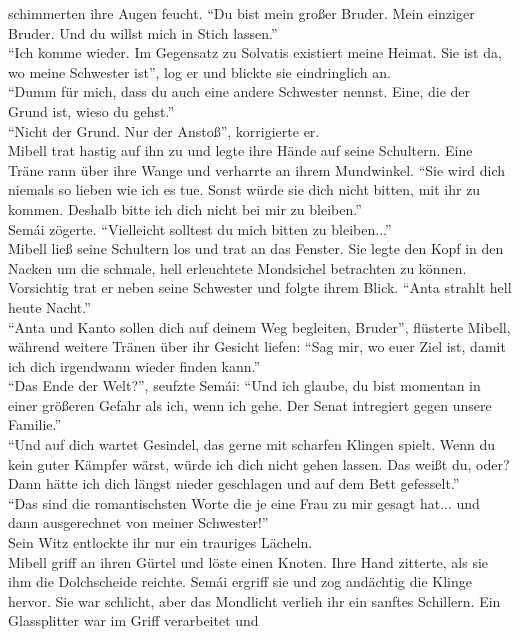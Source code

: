 schimmerten ihre Augen feucht. ``Du bist mein großer Bruder. Mein einziger Bruder. Und du willst 
mich in Stich lassen.''\\
``Ich komme wieder. Im Gegensatz zu Solvatis existiert meine Heimat. Sie ist da, wo meine Schwester 
ist'', log er und blickte sie eindringlich an.\\
``Dumm für mich, dass du auch eine andere Schwester nennst. Eine, die der Grund ist, wieso du 
gehst.''\\
``Nicht der Grund. Nur der Anstoß'', korrigierte er.\\
Mibell trat hastig auf ihn zu und legte ihre Hände auf seine Schultern. Eine Träne rann über ihre 
Wange und verharrte an ihrem Mundwinkel. ``Sie wird dich niemals so lieben wie ich es tue. Sonst 
würde sie dich nicht bitten, mit ihr zu kommen. Deshalb bitte ich dich nicht bei mir zu bleiben.''\\
Semái zögerte. ``Vielleicht solltest du mich bitten zu bleiben...''\\
Mibell ließ seine Schultern los und trat an das Fenster. Sie legte den Kopf in den Nacken um die 
schmale, hell erleuchtete Mondsichel betrachten zu können. Vorsichtig trat er neben seine Schwester 
und folgte ihrem Blick. ``Anta strahlt hell heute Nacht.''\\
``Anta und Kanto sollen dich auf deinem Weg begleiten, Bruder'', flüsterte Mibell, während weitere 
Tränen über ihr Gesicht liefen: ``Sag mir, wo euer Ziel ist, damit ich dich irgendwann wieder 
finden kann.''\\
``Das Ende der Welt?'', seufzte Semái: ``Und ich glaube, du bist momentan in einer größeren Gefahr 
als ich, wenn ich gehe. Der Senat intregiert gegen unsere Familie.''\\
``Und auf dich wartet Gesindel, das gerne mit scharfen Klingen spielt. Wenn du kein guter Kämpfer 
wärst, würde ich dich nicht gehen lassen. Das weißt du, oder? Dann hätte ich dich längst nieder 
geschlagen und auf dem Bett gefesselt.''\\
``Das sind die romantischsten Worte die je eine Frau zu mir gesagt hat... und dann ausgerechnet von 
meiner Schwester!''\\
Sein Witz entlockte ihr nur ein trauriges Lächeln. \\
Mibell griff an ihren Gürtel und löste einen Knoten. Ihre Hand zitterte, als sie ihm die 
Dolchscheide reichte. Semái ergriff sie und zog andächtig die Klinge hervor. Sie war schlicht, aber 
das Mondlicht verlieh ihr ein sanftes Schillern. Ein Glassplitter war im Griff verarbeitet und 
